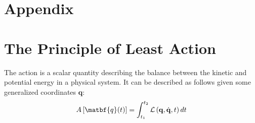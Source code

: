 \documentclass[draft]{agujournal2019}
\begin{document}
%
%



%
%

\section{Appendix}
\appendix
\section{The Principle of Least Action}
\begin{definition}
    The action is a scalar quantity describing the balance between the kinetic and potential energy in a physical system. It can be described as follows given some generalized coordinates $\mathbf{q}$:
    \begin{align*}
        A\left[ \matbf{q}(t) \right] = \int_{t_1}^{t_2} \mathcal{L}\left(\mathbf{q}, \dot{\mathbf{q}}, t\right) dt
    \end{align*}
\end{definition}
\end{document}
